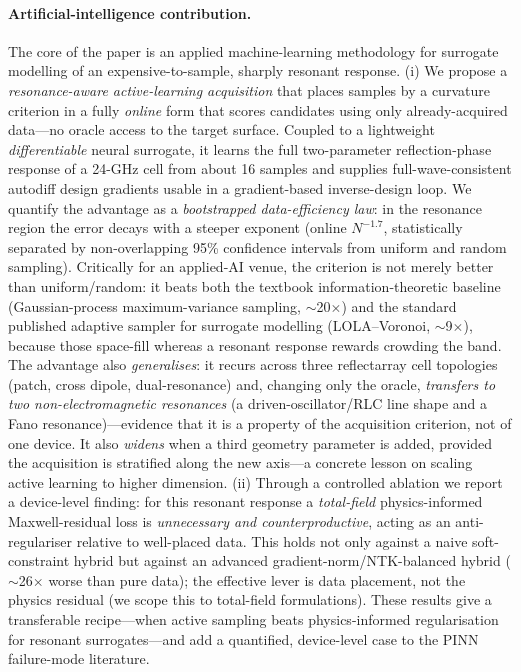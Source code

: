 \documentclass[11pt]{article}
\begin{document}
\paragraph{Artificial-intelligence contribution.} The core of the paper is an applied machine-learning
methodology for surrogate modelling of an expensive-to-sample, sharply resonant response. (i) We propose
a \emph{resonance-aware active-learning acquisition} that places samples by a curvature criterion
in a fully \emph{online} form that scores candidates using only already-acquired data---no
oracle access to the target surface. Coupled to a lightweight \emph{differentiable} neural surrogate, it
learns the full two-parameter reflection-phase response of a 24-GHz cell from about 16 samples and supplies
full-wave-consistent autodiff design gradients usable in a gradient-based inverse-design loop. We quantify
the advantage as a \emph{bootstrapped data-efficiency law}: in the resonance region the error decays with a
steeper exponent (online $N^{-1.7}$, statistically separated by non-overlapping 95\% confidence intervals
from uniform and random sampling). Critically for an applied-AI venue, the criterion is not merely better
than uniform/random: it beats both the textbook information-theoretic baseline (Gaussian-process
maximum-variance sampling, $\sim$20$\times$) and the standard published adaptive sampler for surrogate
modelling (LOLA--Voronoi, $\sim$9$\times$), because those space-fill whereas a resonant response rewards
crowding the band. The advantage also \emph{generalises}: it recurs across three reflectarray cell
topologies (patch, cross dipole, dual-resonance) and, changing only the oracle, \emph{transfers to two
non-electromagnetic resonances} (a driven-oscillator/RLC line shape and a Fano resonance)---evidence that it
is a property of the acquisition criterion, not of one device. It also \emph{widens} when a third geometry
parameter is added, provided the acquisition is stratified along the new axis---a concrete lesson on scaling
active learning to higher dimension. (ii) Through a controlled ablation we report a device-level finding:
for this resonant response a \emph{total-field} physics-informed Maxwell-residual loss is \emph{unnecessary
and counterproductive}, acting as an anti-regulariser relative to well-placed data. This holds not only
against a naive soft-constraint hybrid but against an advanced gradient-norm/NTK-balanced hybrid
($\sim$26$\times$ worse than pure data); the effective lever is data placement, not the physics residual
(we scope this to total-field formulations). These results give a transferable recipe---when active
sampling beats physics-informed regularisation for resonant surrogates---and add a quantified, device-level
case to the PINN failure-mode literature.
\end{document}
